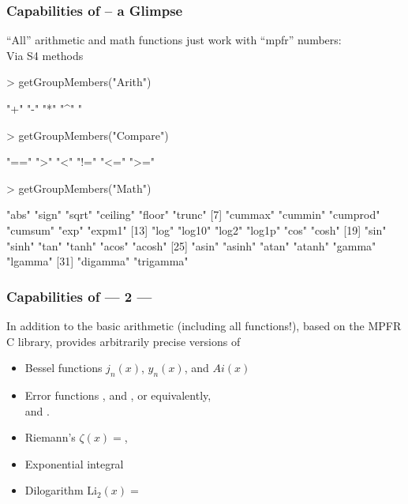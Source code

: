 



\begin{frame}[fragile]\frametitle{Capabilities of  -- a Glimpse}
  ``All'' \R arithmetic and math functions just work with ``mpfr''
  numbers:  \\
  Via  S4 methods

\begin{Schunk}
\begin{Sinput}
> getGroupMembers("Arith")
\end{Sinput}
\begin{Soutput}
[1] "+"   "-"   "*"   "^"   "%%"  "%/%" "/"  
\end{Soutput}
\begin{Sinput}
> getGroupMembers("Compare")
\end{Sinput}
\begin{Soutput}
[1] "==" ">"  "<"  "!=" "<=" ">="
\end{Soutput}
\begin{Sinput}
> getGroupMembers("Math")
\end{Sinput}
\begin{Soutput}
 [1] "abs"      "sign"     "sqrt"     "ceiling"  "floor"    "trunc"   
 [7] "cummax"   "cummin"   "cumprod"  "cumsum"   "exp"      "expm1"   
[13] "log"      "log10"    "log2"     "log1p"    "cos"      "cosh"    
[19] "sin"      "sinh"     "tan"      "tanh"     "acos"     "acosh"   
[25] "asin"     "asinh"    "atan"     "atanh"    "gamma"    "lgamma"  
[31] "digamma"  "trigamma"
\end{Soutput}
\end{Schunk}
\end{frame}

\begin{frame}[fragile]\frametitle{Capabilities of  --- 2 ---}
  In addition to the basic arithmetic (including all  functions!),
  based on the MPFR C library,
   provides arbitrarily precise versions of

  \begin{itemize}
  \item Bessel functions $j_n(x)$, $y_n(x)$, and $Ai(x)$
  \item Error functions , and , or equivalently,\\
     and .
  \item Riemann's $\zeta(x) = $,
  \item Exponential integral 
  \item Dilogarithm $\mathrm{Li}_2(x)=$
  \end{itemize}
\end{frame}

